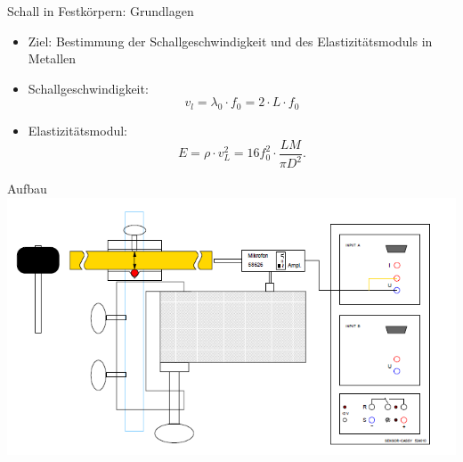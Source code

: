 \documentclass[12pt]{beamer}
\begin{document}
	
	
	
	
	
	
	
	
	
\begin{frame}{Schall in Festkörpern: Grundlagen}
	\begin{itemize}
		\item Ziel: Bestimmung der Schallgeschwindigkeit und des Elastizitätsmoduls in Metallen
		\item Schallgeschwindigkeit:
		\begin{equation}
		v_l = \lambda_0 \cdot f_0 = 2 \cdot L \cdot f_0
		\label{eq:002}
		\end{equation}
		\item Elastizitätsmodul:
		\begin{equation}
		E = \rho \cdot v_L^2 =  16 f_0^2 \cdot \dfrac{L M}{\pi D^2}.
		\label{eq:003}
		\end{equation}
	\end{itemize}
\end{frame}

\begin{frame}{Aufbau}
	\includegraphics[width=\linewidth,height=\textheight,keepaspectratio]{Bilder/AufbauMessungSchallgeschwindigkeitMetallstab.PNG}
	\centering
\end{frame}
\end{document}

